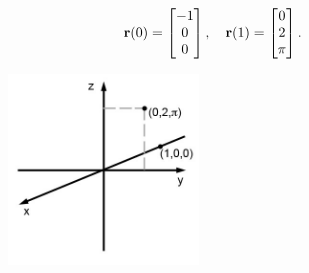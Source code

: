 \documentclass{article}
\begin{document}
\begin{enumerate}
\begin{align*}
  \mathbf{r}(0) &= \begin{bmatrix} -1 \\ 0 \\ 0 \end{bmatrix} , \quad
  \mathbf{r}(1) = \begin{bmatrix} 0 \\ 2 \\ \pi \end{bmatrix}.
\end{align*}
\EEN
\begin{figure}[h]
  \vspace{-10pt}
  \begin{center}
    \includegraphics[width=0.45\textwidth]{WA03Particle.jpg}
  \end{center}
  \vspace{-20pt}
\end{figure}
\end{enumerate} %
\end{document}
